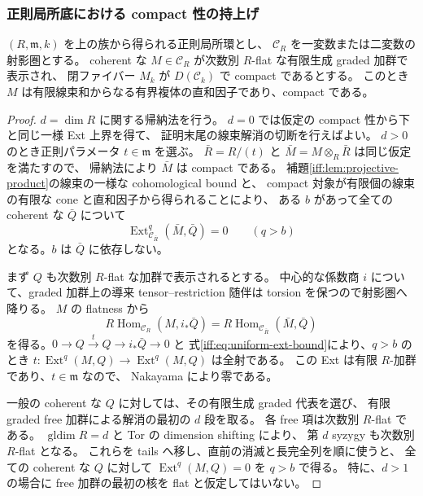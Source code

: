\subsubsection{正則局所底における compact 性の持上げ}

\begin{lemma}
\label{iff:lem:regular-base-compact-lift}
$(R,\mathfrak m,k)$ を上の族から得られる正則局所環とし、
$\mathcal C_R$ を一変数または二変数の射影圏とする。
coherent な $M\in\mathcal C_R$ が次数別 $R$-flat な有限生成 graded 加群で表示され、
閉ファイバー $M_k$ が $D(\mathcal C_k)$ で compact であるとする。
このとき $M$ は有限線束和からなる有界複体の直和因子であり、compact である。
\end{lemma}

\begin{proof}
$d=\dim R$ に関する帰納法を行う。
$d=0$ では仮定の compact 性から下と同じ一様 Ext 上界を得て、
証明末尾の線束解消の切断を行えばよい。
$d>0$ のとき正則パラメータ $t\in\mathfrak m$ を選ぶ。
$\bar R=R/(t)$ と $\bar M=M\otimes_R\bar R$ は同じ仮定を満たすので、
帰納法により $\bar M$ は compact である。
補題\ref{iff:lem:projective-product}の線束の一様な cohomological bound と、
compact 対象が有限個の線束の有限な cone と直和因子から得られることにより、
ある $b$ があって全ての coherent な $\bar Q$ について
\begin{equation}\label{iff:eq:uniform-ext-bound}
 \operatorname{Ext}^q_{\mathcal C_{\bar R}}(\bar M,\bar Q)=0
                \qquad(q>b)
\end{equation}
となる。$b$ は $\bar Q$ に依存しない。

まず $Q$ も次数別 $R$-flat な加群で表示されるとする。
中心的な係数商 $i$ について、graded 加群上の導来 tensor--restriction 随伴は
torsion を保つので射影圏へ降りる。
$M$ の flatness から
\[
 R\operatorname{Hom}_{\mathcal C_R}(M,i_*\bar Q)
   =R\operatorname{Hom}_{\mathcal C_{\bar R}}(\bar M,\bar Q)
\]
を得る。$0\to Q\xrightarrow{t}Q\to i_*\bar Q\to0$ と
式\eqref{iff:eq:uniform-ext-bound}により、$q>b$ のとき
$t:\operatorname{Ext}^q(M,Q)\to\operatorname{Ext}^q(M,Q)$ は全射である。
この Ext は有限 $R$-加群であり、$t\in\mathfrak m$ なので、
Nakayama により零である。

一般の coherent な $Q$ に対しては、その有限生成 graded 代表を選び、
有限 graded free 加群による解消の最初の $d$ 段を取る。
各 free 項は次数別 $R$-flat である。
$\operatorname{gldim}R=d$ と Tor の dimension shifting により、
第 $d$ syzygy も次数別 $R$-flat となる。
これらを tails へ移し、直前の消滅と長完全列を順に使うと、
全ての coherent な $Q$ に対して $\operatorname{Ext}^q(M,Q)=0$ を $q>b$ で得る。
特に、$d>1$ の場合に free 加群の最初の核を flat と仮定してはいない。


\end{proof}
